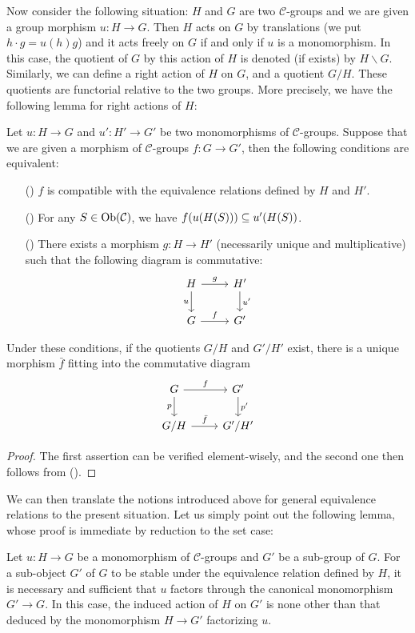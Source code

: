 Now consider the following situation: $H$ and $G$ are two $\mathcal{C}$-groups and we are given a group morphism $u:H\to G$. Then $H$ acts on $G$ by translations (we put $h\cdot g=u(h)g$) and it acts freely on $G$ if and only if $u$ is a monomorphism. In this case, the quotient of $G$ by this action of $H$ is denoted (if exists) by $H\backslash G$. Similarly, we can define a right action of $H$ on $G$, and a quotient $G/H$. These quotients are functorial relative to the two groups. More precisely, we have the following lemma for right actions of $H$:

\begin{lemma}\label{category equivalence relation by free action compatible morphism iff}
Let $u:H\to G$ and $u':H'\to G'$ be two monomorphisms of $\mathcal{C}$-groups. Suppose that we are given a morphism of $\mathcal{C}$-groups $f:G\to G'$, then the following conditions are equivalent:
\begin{enumerate}
    \item[(\rmnum{1})] $f$ is compatible with the equivalence relations defined by $H$ and $H'$.
    \item[(\rmnum{2})] For any $S\in\mathrm{Ob}(\mathcal{C})$, we have $f(u(H(S)))\subseteq u'(H(S))$.
    \item[(\rmnum{3})] There exists a morphism $g:H\to H'$ (necessarily unique and multiplicative) such that the following diagram is commutative:
    \[\begin{tikzcd}
    H\ar[r,"g"]\ar[d,swap,"u"]&H'\ar[d,"u'"]\\
    G\ar[r,"f"]&G'
    \end{tikzcd}\] 
\end{enumerate}
Under these conditions, if the quotients $G/H$ and $G'/H'$ exist, there is a unique morphism $\bar{f}$ fitting into the commutative diagram
\[\begin{tikzcd}
G\ar[r,"f"]\ar[d,swap,"p"]&G'\ar[d,"p'"]\\
G/H\ar[r,"\bar{f}"]&G'/H'
\end{tikzcd}\]
\end{lemma}
\begin{proof}
The first assertion can be verified element-wisely, and the second one then follows from ().
\end{proof}

We can then translate the notions introduced above for general equivalence relations to the present situation. Let us simply point out the following lemma, whose proof is immediate by reduction to the set case:
\begin{lemma}\label{category equivalence relation by free action stable subobject iff}
Let $u:H\to G$ be a monomorphism of $\mathcal{C}$-groups and $G'$ be a sub-group of $G$. For a sub-object $G'$ of $G$ to be stable under the equivalence relation defined by $H$, it is necessary and sufficient that $u$ factors through the canonical monomorphism $G'\to G$. In this case, the induced action of $H$ on $G'$ is none other than that deduced by the monomorphism $H\to G'$ factorizing $u$.
\end{lemma}

